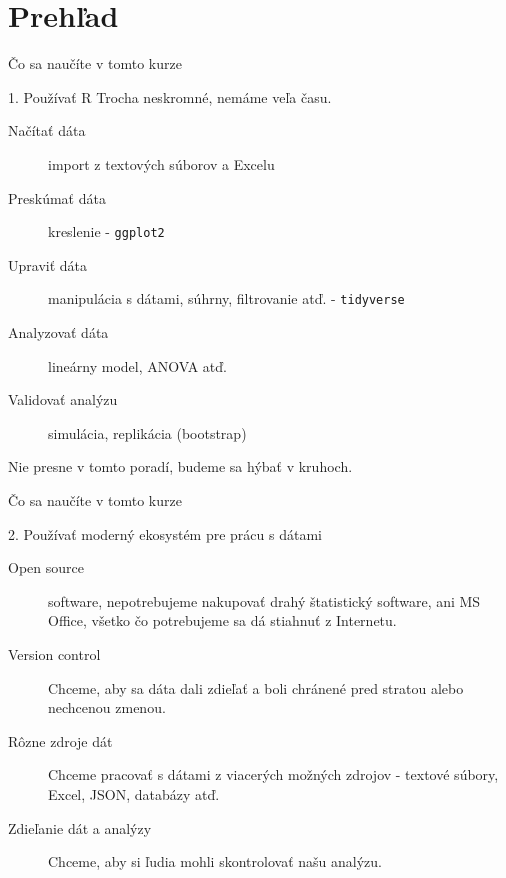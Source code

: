 \section{Prehľad}
\begin{frame}{Čo sa naučíte v tomto kurze}
	\begin{block}{1. Používať R}
		Trocha neskromné, nemáme veľa času.
		\begin{description}
			\item[Načítať dáta] import z textových súborov a Excelu
			\item[Preskúmať dáta] kreslenie - \texttt{ggplot2}
			\item[Upraviť dáta] manipulácia s dátami, súhrny, filtrovanie atď. - \texttt{tidyverse}
			\item[Analyzovať dáta] lineárny model, ANOVA atď.
			\item[Validovať analýzu] simulácia, replikácia (bootstrap)
		\end{description}
		Nie presne v tomto poradí, budeme sa hýbať v kruhoch.
	\end{block}
\end{frame}

\begin{frame}{Čo sa naučíte v tomto kurze}
	\begin{block}{2. Používať moderný ekosystém pre prácu s dátami}
		\begin{description}
			\item[Open source] software, nepotrebujeme nakupovať drahý štatistický software, ani MS Office, všetko čo potrebujeme sa dá stiahnuť z Internetu.
			\item[Version control] Chceme, aby sa dáta dali zdieľať a boli chránené pred stratou alebo nechcenou zmenou.
			\item[Rôzne zdroje dát] Chceme pracovať s dátami z viacerých možných zdrojov - textové súbory, Excel, JSON, databázy atď.
			\item[Zdieľanie dát a analýzy] Chceme, aby si ľudia mohli skontrolovať našu analýzu.
		\end{description}
	\end{block}
\end{frame}



